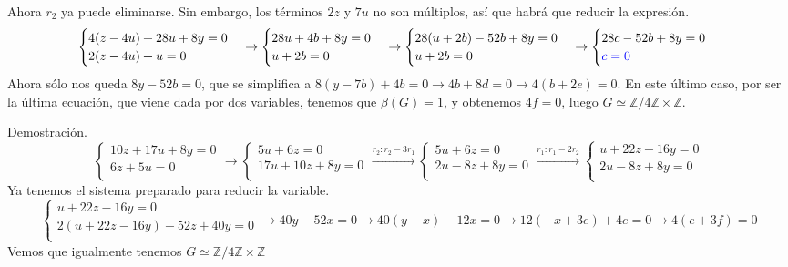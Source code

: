 \documentclass[a4paper, 11pt]{extarticle}
\newcommand{\dem}[1]{\textcolor{gris}{\small{Demostración. #1}}}
\begin{document}
Ahora \(r_2\) ya puede eliminarse. Sin embargo, los términos \(2z\) y \(7u\)
 no son múltiplos, así que habrá que reducir la expresión.
$$\begin{cases}
4(z-4u)+28u+8y=0\\
2(z-4u)+u=0\\
\end{cases}
\rightarrow 
\begin{cases}
28u+4b+8y=0\\
u+2b=0\\
\end{cases}
 \rightarrow 
\begin{cases}
28(u+2b)-52b+8y=0\\
u+2b=0\\
\end{cases}
\rightarrow 
\begin{cases}
28c-52b+8y=0\\
\textcolor{blue}{c=0}\\
\end{cases}$$
Ahora sólo nos queda \(8y-52b=0\), que se simplifica a \(8(y-7b) + 4b=0
\rightarrow 4b+8d = 0 \rightarrow 4(b+2e)=0\). En este último caso, por ser la
última ecuación, que viene dada por dos variables, tenemos que \(\beta(G) = 1\), y obtenemos \(4f=0\), luego \(G \simeq \mathbb{Z}/ 4 \mathbb{Z} \times
\mathbb{Z}\).

\dem{$$
\begin{cases} 
10z + 17u + 8y= 0 \\ 
6z +5u = 0 \\ 
\end{cases} \rightarrow 
\begin{cases} 
5u + 6z = 0 \\
17u+10z+8y=0\\ 
\end{cases} \xrightarrow{r_2:r_2-3r_1}   
\begin{cases} 
5u + 6z = 0 \\
2u-8z+8y=0\\ 
\end{cases}
 \xrightarrow{r_1:r_1-2r_2}   
\begin{cases} 
u + 22z-16y=0 \\
2u-8z+8y=0\\ 
\end{cases}
$$
Ya tenemos el sistema preparado para reducir la variable.
$$\begin{cases} 
u + 22z-16y=0 \\
2(u+22z-16y)-52z+40y=0\\ 
\end{cases} \rightarrow 40y - 52x = 0 \rightarrow 40(y-x) - 12x = 0 \rightarrow 12(-x + 3e) + 4e = 0 \rightarrow  4(e + 3f) = 0
$$
Vemos que igualmente tenemos \( G \simeq \mathbb{Z}/ 4 \mathbb{Z} \times
\mathbb{Z} \)
}
\end{document}
